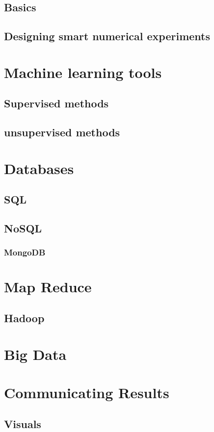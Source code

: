 \documentclass[10pt]{PhDthesisPSnPDF}%
\begin{document}
\section{Basics}\label{numBasics}
\section{Designing smart numerical experiments}\label{NumDesign}
\chapter{Machine learning tools}\label{MLearn}
\section{Supervised methods}
\section{unsupervised methods}
\chapter{Databases}\label{databases}
\section{SQL}
\section{NoSQL}
\subsection{MongoDB}
\chapter{Map Reduce}\label{mapR}
\section{Hadoop}
\chapter{Big Data}\label{bigData}
\chapter{Communicating Results}\label{Commun}
\section{Visuals}\label{Visuals}
\end{document}
